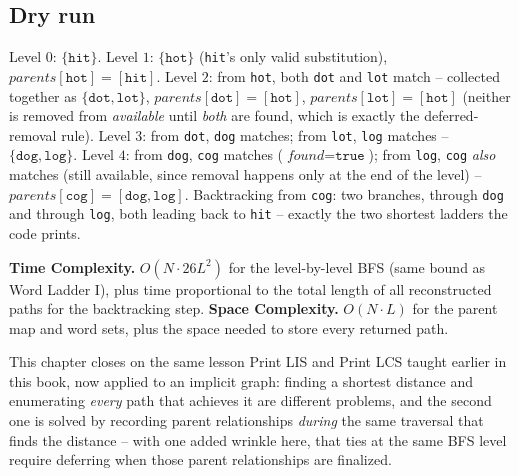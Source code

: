 \subsection*{Dry run}


Level $0$: $\{\texttt{hit}\}$. Level $1$: $\{\texttt{hot}\}$
(\texttt{hit}'s only valid substitution), $\textit{parents}[\texttt{hot}]=[\texttt{hit}]$.
Level $2$: from \texttt{hot}, both \texttt{dot} and \texttt{lot} match
-- collected together as $\{\texttt{dot},\texttt{lot}\}$,
$\textit{parents}[\texttt{dot}]=[\texttt{hot}]$,
$\textit{parents}[\texttt{lot}]=[\texttt{hot}]$ (neither is removed
from \textit{available} until \emph{both} are found, which is exactly
the deferred-removal rule). Level $3$: from \texttt{dot}, \texttt{dog}
matches; from \texttt{lot}, \texttt{log} matches --
$\{\texttt{dog},\texttt{log}\}$. Level $4$: from \texttt{dog},
\texttt{cog} matches ($\textit{found}=\texttt{true}$); from
\texttt{log}, \texttt{cog} \emph{also} matches (still available, since
removal happens only at the end of the level) --
$\textit{parents}[\texttt{cog}]=[\texttt{dog},\texttt{log}]$.
Backtracking from \texttt{cog}: two branches, through \texttt{dog} and
through \texttt{log}, both leading back to \texttt{hit} -- exactly the
two shortest ladders the code prints.

\begin{complexitybox}
\textbf{Time Complexity.} $O(N \cdot 26L^2)$ for the level-by-level BFS
(same bound as Word Ladder I), plus time proportional to the total
length of all reconstructed paths for the backtracking step.
\textbf{Space Complexity.} $O(N \cdot L)$ for the parent map and word
sets, plus the space needed to store every returned path.
\end{complexitybox}

\begin{takeawaybox}
This chapter closes on the same lesson Print LIS and Print LCS taught
earlier in this book, now applied to an implicit graph: finding a
shortest distance and enumerating \emph{every} path that achieves it
are different problems, and the second one is solved by recording
parent relationships \emph{during} the same traversal that finds the
distance -- with one added wrinkle here, that ties at the same BFS
level require deferring when those parent relationships are finalized.
\end{takeawaybox}
